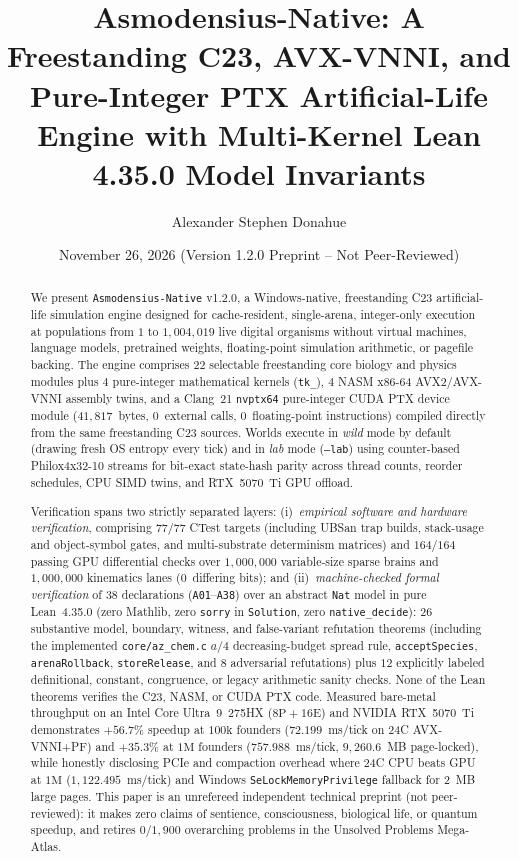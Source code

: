 \documentclass[11pt,reqno]{amsart}
\title[Asmodensius-Native v1.2.0]{Asmodensius-Native: A Freestanding C23, AVX-VNNI, and Pure-Integer PTX Artificial-Life Engine with Multi-Kernel Lean 4.35.0 Model Invariants}
\author{Alexander Stephen Donahue}
\date{November 26, 2026 (Version 1.2.0 Preprint -- Not Peer-Reviewed)}
\newcommand{\code}[1]{\texttt{\footnotesize #1}}
\newcommand{\us}{\_\allowbreak}
\newcommand{\slsh}{/\allowbreak}
\begin{document}
\begin{abstract}
We present \code{Asmodensius-Native} v1.2.0, a Windows-native, freestanding C23 artificial-life simulation engine designed for cache-resident, single-arena, integer-only execution at populations from $1$ to $1{,}004{,}019$ live digital organisms without virtual machines, language models, pretrained weights, floating-point simulation arithmetic, or pagefile backing. The engine comprises $22$ selectable freestanding core biology and physics modules plus $4$ pure-integer mathematical kernels (\code{tk\us*}), $4$ NASM x86-64 AVX2/AVX-VNNI assembly twins, and a Clang~21 \code{nvptx64} pure-integer CUDA PTX device module ($41{,}817$~bytes, $0$~external calls, $0$~floating-point instructions) compiled directly from the same freestanding C23 sources. Worlds execute in \emph{wild} mode by default (drawing fresh OS entropy every tick) and in \emph{lab} mode (\code{--lab}) using counter-based Philox4x32-10 streams for bit-exact state-hash parity across thread counts, reorder schedules, CPU SIMD twins, and RTX~5070~Ti GPU offload.

Verification spans two strictly separated layers: (i)~\emph{empirical software and hardware verification}, comprising $77/77$ CTest targets (including UBSan trap builds, stack-usage and object-symbol gates, and multi-substrate determinism matrices) and $164/164$ passing GPU differential checks over $1{,}000{,}000$ variable-size sparse brains and $1{,}000{,}000$ kinematics lanes ($0$~differing bits); and (ii)~\emph{machine-checked formal verification} of $38$ declarations (\code{A01}--\code{A38}) over an abstract \code{Nat} model in pure Lean~4.35.0 (zero Mathlib, zero \code{sorry} in \code{Solution}, zero \code{native\us decide}): $26$ substantive model, boundary, witness, and false-variant refutation theorems (including the implemented \code{core\slsh az\us chem.c} $a/4$ decreasing-budget spread rule, \code{acceptSpecies}, \code{arenaRollback}, \code{storeRelease}, and $8$ adversarial refutations) plus $12$ explicitly labeled definitional, constant, congruence, or legacy arithmetic sanity checks. None of the Lean theorems verifies the C23, NASM, or CUDA PTX code. Measured bare-metal throughput on an Intel Core Ultra~9~275HX ($8\text{P}+16\text{E}$) and NVIDIA RTX~5070~Ti demonstrates $+56.7\%$ speedup at $100\text{k}$ founders ($72.199$~ms/tick on 24C AVX-VNNI+PF) and $+35.3\%$ at $1\text{M}$ founders ($757.988$~ms/tick, $9{,}260.6$~MB page-locked), while honestly disclosing PCIe and compaction overhead where 24C CPU beats GPU at $1\text{M}$ ($1{,}122.495$~ms/tick) and Windows \code{SeLockMemoryPrivilege} fallback for 2~MB large pages. This paper is an unrefereed independent technical preprint (not peer-reviewed): it makes zero claims of sentience, consciousness, biological life, or quantum speedup, and retires $0/1{,}900$ overarching problems in the Unsolved Problems Mega-Atlas.
\end{abstract}
\end{document}

